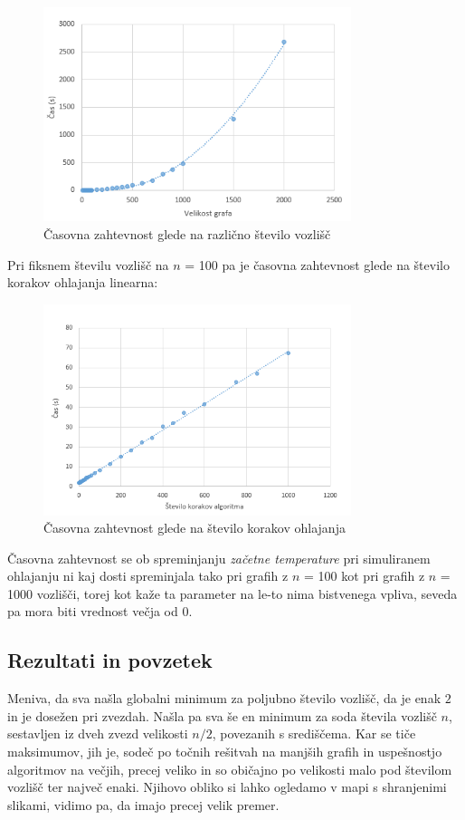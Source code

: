 \documentclass[a4paper, 12 pt]{article}
\begin{document}
\begin{figure}[H]
\centering
  \includegraphics[width=9cm]{casovna_p1_n.png}
  \caption{Časovna zahtevnost glede na različno število vozlišč}
  \label{fig:p1_časovna_zaht_n} 
\end{figure}

\pagebreak
Pri fiksnem številu vozlišč na $n$ = 100 pa je časovna zahtevnost glede na število korakov ohlajanja linearna:

\begin{figure}[H]
\centering
  \includegraphics[width=9cm]{casovna_p1_kmax.png}
  \caption{Časovna zahtevnost glede na število korakov ohlajanja}
  \label{fig:p1_časovna_zaht_kmax} 
\end{figure}

Časovna zahtevnost se ob spreminjanju \textit{začetne temperature} pri simuliranem ohlajanju ni kaj dosti spreminjala tako pri grafih z $n$ = 100 kot pri grafih z $n$ = 1000 vozlišči, torej kot kaže ta parameter na le-to nima bistvenega vpliva, seveda pa mora biti vrednost večja od 0.

\subsection{Rezultati in povzetek}

Meniva, da sva našla globalni minimum za poljubno število vozlišč, da je enak $2$ in je dosežen pri zvezdah. Našla pa sva še en minimum za soda števila vozlišč $n$, sestavljen iz dveh zvezd velikosti $n/2$, povezanih s središčema. Kar se tiče maksimumov, jih je, sodeč po točnih rešitvah na manjših grafih in uspešnostjo algoritmov na večjih, precej veliko in so običajno po velikosti malo pod številom vozlišč ter največ enaki. Njihovo obliko si lahko ogledamo v mapi s shranjenimi slikami, vidimo pa, da imajo precej velik premer.
\end{document}

